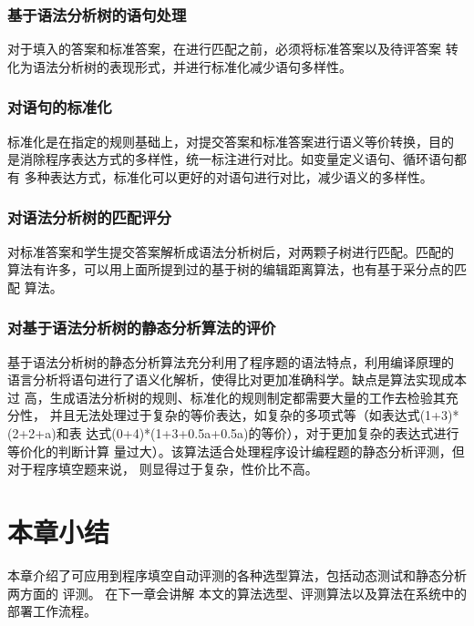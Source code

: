 \subsubsection{基于语法分析树的语句处理}
对于填入的答案和标准答案，在进行匹配之前，必须将标准答案以及待评答案
转化为语法分析树的表现形式，并进行标准化减少语句多样性\cite{Hattori1996A}。

\subsubsection{对语句的标准化}
标准化是在指定的规则基础上，对提交答案和标准答案进行语义等价转换，目的
是消除程序表达方式的多样性，统一标注进行对比。如变量定义语句、循环语句都有
多种表达方式，标准化可以更好的对语句进行对比，减少语义的多样性。

\subsubsection{对语法分析树的匹配评分}
对标准答案和学生提交答案解析成语法分析树后，对两颗子树进行匹配。匹配的
算法有许多，可以用上面所提到过的基于树的编辑距离算法，也有基于采分点的匹配
算法。

\subsubsection{对基于语法分析树的静态分析算法的评价}
基于语法分析树的静态分析算法充分利用了程序题的语法特点，利用编译原理的
语言分析将语句进行了语义化解析，使得比对更加准确科学。缺点是算法实现成本过
高，生成语法分析树的规则、标准化的规则制定都需要大量的工作去检验其充分性，
并且无法处理过于复杂的等价表达，如复杂的多项式等（如表达式(1+3)*(2+2+a)和表
达式(0+4)*(1+3+0.5a+0.5a)的等价），对于更加复杂的表达式进行等价化的判断计算
量过大）。该算法适合处理程序设计编程题的静态分析评测，但对于程序填空题来说，
则显得过于复杂，性价比不高。

\section{本章小结}
本章介绍了可应用到程序填空自动评测的各种选型算法，包括动态测试和静态分析两方面的
评测。
在下一章会讲解
本文的算法选型、评测算法以及算法在系统中的部署工作流程。

\clearpage

% 
% 

